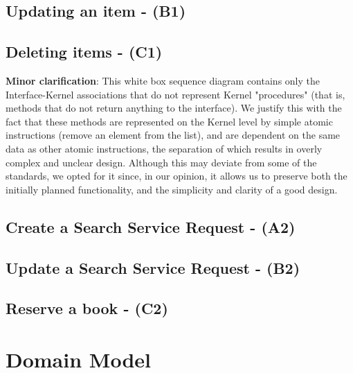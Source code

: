 \documentclass{article}
\begin{document}
\subsection{Updating an item - (B1)}



\subsection{Deleting items - (C1)}



\textbf{Minor clarification}: This white box sequence diagram contains only the Interface-Kernel associations that do not represent Kernel "procedures" (that is, methods that do not return anything to the interface). We justify this with the fact that these methods are represented on the Kernel level by simple atomic instructions (remove an element from the list), and are dependent on the same data as other atomic instructions, the separation of which results in overly complex and unclear design. Although this may deviate from some of the standards, we opted for it since, in our opinion, it allows us to preserve both the initially planned functionality, and the simplicity and clarity of a good design. 


\subsection{Create a Search Service Request - (A2)}


\subsection{Update a Search Service Request - (B2)}


\subsection{Reserve a book - (C2)}



\section{Domain Model}

\end{document}

